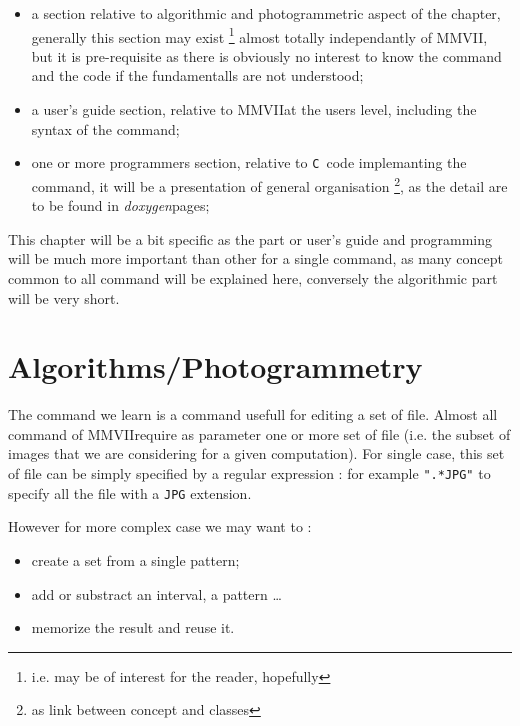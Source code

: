 \documentclass[a4paper]{book}
\newcommand{\CPP}{\mbox{\tt C\hspace{-0.05cm}\raisebox{0.2ex}{\small ++} }}
\newcommand{\PPP}{MMVII}
\newcommand{\doxy}{\emph{doxygen}}
\begin{document}
\begin{itemize}
   \item a section relative to algorithmic and photogrammetric aspect of the chapter, generally this
         section may exist \footnote{i.e. may be of interest for the reader, hopefully}
         almost totally independantly of \PPP, but it is pre-requisite as
         there is obviously no interest to know the command and the code if the fundamentalls are
         not understood;

   \item a  user's guide section, relative to \PPP at the users level, including the syntax of the command;

   \item one or more   programmers  section, relative to \CPP code implemanting the command, it will be a
         presentation of general organisation \footnote{as link between concept and classes},
         as the detail are to be found in \doxy pages;

\end{itemize}

This chapter will be a bit specific as the part or user's guide and programming will be much more important 
than other for a single command, as many concept common to all command will be explained here,
conversely  the algorithmic part will be very short.


\section{Algorithms/Photogrammetry}

The command we learn is a command usefull for editing a set of file.
Almost all command of \PPP require as parameter one or more set of 
file (i.e. the subset of images that we are considering for a given computation).
For single case, this set of file can be simply specified by a regular expression :
for example {\tt ".*JPG"} to specify all the file with a {\tt JPG} extension.

However for more complex case we may want to :

\begin{itemize}
   \item  create a set from a single pattern;
   \item  add or substract an interval, a pattern \dots
   \item  memorize the result and reuse it.
\end{itemize}
\end{document}
